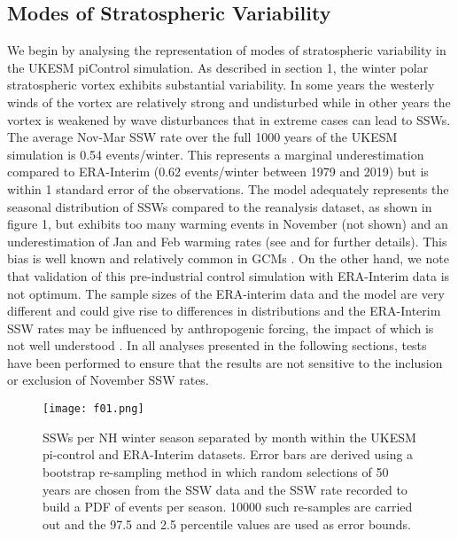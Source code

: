 \documentclass[wcd, manuscript]{copernicus}
\begin{document}
\subsection{Modes of Stratospheric Variability}
We begin by analysing the representation of modes of stratospheric variability in the UKESM piControl simulation. As described in section 1, the winter polar stratospheric vortex  exhibits substantial variability. In some years the westerly winds of the vortex are relatively strong and undisturbed while in other years the vortex is weakened by wave disturbances that in extreme cases can lead to SSWs. The average Nov-Mar SSW rate over the full 1000 years of the UKESM simulation is 0.54 events/winter. This represents a marginal underestimation compared to ERA-Interim (0.62 events/winter between 1979 and 2019) but is within 1 standard error of the observations. The model adequately represents the seasonal distribution of SSWs compared to the reanalysis dataset, as shown in figure 1, but exhibits too many warming events in November (not shown) and an underestimation of Jan and Feb warming rates (see \cite{Andrews2020} and \cite{Menary2018} for further details). This bias is well known and relatively common in GCMs \citep{Charlton2007, Ayarz2020}. On the other hand, we note that validation of this pre-industrial control simulation with ERA-Interim data is not optimum. The sample sizes of the ERA-interim data and the model are very different and could give rise to differences in distributions \citep{Horan2017} and the ERA-Interim SSW rates may be influenced by anthropogenic forcing, the impact of which is not well understood \citep{Ayarz2020}. In all analyses presented in the following sections, tests have been performed to ensure that the results are not sensitive to the inclusion or exclusion of November SSW rates. 

\begin{center}
\begin{figure}[h!]
\noindent\texttt{[image: f01.png]}
\caption{SSWs per NH winter season separated by month within the UKESM pi-control and ERA-Interim datasets. Error bars are derived using a bootstrap re-sampling method in which random selections of 50 years are chosen from the SSW data and the SSW rate recorded to build a PDF of events per season. 10000 such re-samples are carried out and the 97.5 and 2.5 percentile values are used as error bounds.}
\label{fig1}
\end{figure}
\end{center}
\end{document}
